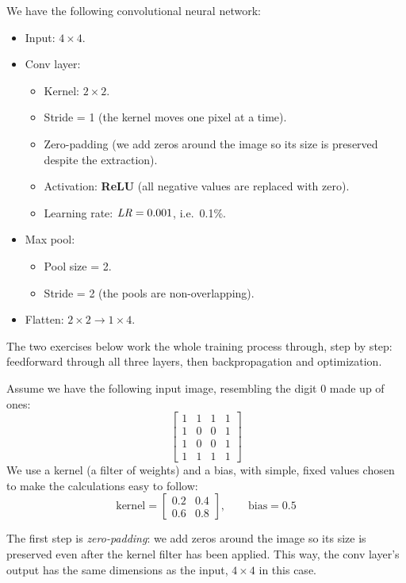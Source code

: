 \label{c6:set:1}\label{c6:app:b}
We have the following convolutional neural network:
\begin{itemize}
  \item Input: \textbf{$4 \times 4$}.
  \item Conv layer:
  \begin{itemize}
    \item Kernel: \textbf{$2 \times 2$}.
    \item Stride = 1 (the kernel moves one pixel at a time).
    \item Zero-padding (we add zeros around the image so its size is preserved despite the
      extraction).
    \item Activation: \textbf{ReLU} (all negative values are replaced with zero).
    \item Learning rate: $\mathit{LR} = 0.001$, i.e.\ 0.1\%.
  \end{itemize}
  \item Max pool:
  \begin{itemize}
    \item Pool size = 2.
    \item Stride = 2 (the pools are non-overlapping).
  \end{itemize}
  \item Flatten: $2 \times 2 \rightarrow 1 \times 4$.
\end{itemize}
The two exercises below work the whole training process through, step by step: feedforward
through all three layers, then backpropagation and optimization.

\label{c6:ex:1}
Assume we have the following input image, resembling the digit 0 made up of ones:
\[
  \begin{bmatrix}
    1 & 1 & 1 & 1 \\
    1 & 0 & 0 & 1 \\
    1 & 0 & 0 & 1 \\
    1 & 1 & 1 & 1
  \end{bmatrix}
\]
We use a kernel (a filter of weights) and a bias, with simple, fixed values chosen to make the
calculations easy to follow:
\[
  \text{kernel} = \begin{bmatrix} 0.2 & 0.4 \\ 0.6 & 0.8 \end{bmatrix}, \qquad
  \text{bias} = 0.5
\]

The first step is \emph{zero-padding}: we add zeros around the image so its size is preserved even
after the kernel filter has been applied. This way, the conv layer's output has the same dimensions
as the input, $4 \times 4$ in this case.

